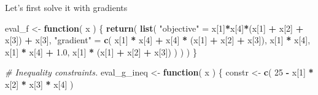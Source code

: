 \documentclass[onecolumn]{article}
\newenvironment{Shaded}{\begin{snugshade}}{\end{snugshade}}
\newcommand{\KeywordTok}[1]{\textcolor[rgb]{0.13,0.29,0.53}{\textbf{#1}}}
\newcommand{\DecValTok}[1]{\textcolor[rgb]{0.00,0.00,0.81}{#1}}
\newcommand{\FloatTok}[1]{\textcolor[rgb]{0.00,0.00,0.81}{#1}}
\newcommand{\StringTok}[1]{\textcolor[rgb]{0.31,0.60,0.02}{#1}}
\newcommand{\CommentTok}[1]{\textcolor[rgb]{0.56,0.35,0.01}{\textit{#1}}}
\newcommand{\ControlFlowTok}[1]{\textcolor[rgb]{0.13,0.29,0.53}{\textbf{#1}}}
\newcommand{\OperatorTok}[1]{\textcolor[rgb]{0.81,0.36,0.00}{\textbf{#1}}}
\newcommand{\NormalTok}[1]{#1}
\begin{document}
Let's first solve it with gradients

\begin{Shaded}
\begin{Highlighting}[]
\NormalTok{eval_f <-}\StringTok{ }\ControlFlowTok{function}\NormalTok{( x ) \{}
        \KeywordTok{return}\NormalTok{( }\KeywordTok{list}\NormalTok{( }\StringTok{"objective"}\NormalTok{ =}\StringTok{ }\NormalTok{x[}\DecValTok{1}\NormalTok{]}\OperatorTok{*}\NormalTok{x[}\DecValTok{4}\NormalTok{]}\OperatorTok{*}\NormalTok{(x[}\DecValTok{1}\NormalTok{] }\OperatorTok{+}\StringTok{ }\NormalTok{x[}\DecValTok{2}\NormalTok{] }\OperatorTok{+}\StringTok{ }\NormalTok{x[}\DecValTok{3}\NormalTok{]) }\OperatorTok{+}\StringTok{ }\NormalTok{x[}\DecValTok{3}\NormalTok{],}
                      \StringTok{"gradient"}\NormalTok{ =}\StringTok{ }\KeywordTok{c}\NormalTok{( x[}\DecValTok{1}\NormalTok{] }\OperatorTok{*}\StringTok{ }\NormalTok{x[}\DecValTok{4}\NormalTok{] }\OperatorTok{+}\StringTok{ }\NormalTok{x[}\DecValTok{4}\NormalTok{] }\OperatorTok{*}\StringTok{ }\NormalTok{(x[}\DecValTok{1}\NormalTok{] }\OperatorTok{+}\StringTok{ }\NormalTok{x[}\DecValTok{2}\NormalTok{] }\OperatorTok{+}\StringTok{ }\NormalTok{x[}\DecValTok{3}\NormalTok{]),}
\NormalTok{                                      x[}\DecValTok{1}\NormalTok{] }\OperatorTok{*}\StringTok{ }\NormalTok{x[}\DecValTok{4}\NormalTok{],}
\NormalTok{                                      x[}\DecValTok{1}\NormalTok{] }\OperatorTok{*}\StringTok{ }\NormalTok{x[}\DecValTok{4}\NormalTok{] }\OperatorTok{+}\StringTok{ }\FloatTok{1.0}\NormalTok{,}
\NormalTok{                                      x[}\DecValTok{1}\NormalTok{] }\OperatorTok{*}\StringTok{ }\NormalTok{(x[}\DecValTok{1}\NormalTok{] }\OperatorTok{+}\StringTok{ }\NormalTok{x[}\DecValTok{2}\NormalTok{] }\OperatorTok{+}\StringTok{ }\NormalTok{x[}\DecValTok{3}\NormalTok{]) ) ) )}
\NormalTok{    \}}

    \CommentTok{# Inequality constraints.}
\NormalTok{    eval_g_ineq <-}\StringTok{ }\ControlFlowTok{function}\NormalTok{( x ) \{}
\NormalTok{        constr <-}\StringTok{ }\KeywordTok{c}\NormalTok{( }\DecValTok{25} \OperatorTok{-}\StringTok{ }\NormalTok{x[}\DecValTok{1}\NormalTok{] }\OperatorTok{*}\StringTok{ }\NormalTok{x[}\DecValTok{2}\NormalTok{] }\OperatorTok{*}\StringTok{ }\NormalTok{x[}\DecValTok{3}\NormalTok{] }\OperatorTok{*}\StringTok{ }\NormalTok{x[}\DecValTok{4}\NormalTok{] )}


\end{Highlighting}
\end{Shaded}
\end{document}
